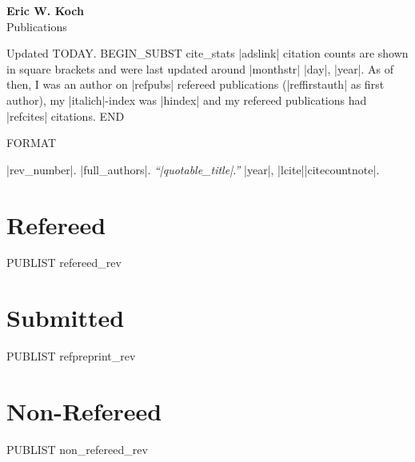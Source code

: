 \documentclass[letterpaper,11pt]{article}
\newcommand{\myname}{Eric W. Koch}
\newcommand{\mysite}{e-koch.github.io}
\newenvironment{publist}{
  \begingroup
  \raggedright
  \begin{description}[leftmargin=4ex,style=sameline]
}{
  \end{description}
  \endgroup
}
\begin{document}
\pagestyle{fancy}
\lhead{} \chead{} \rhead{} \renewcommand{\headrule}{\relax}
\cfoot{\thepage/\pageref*{LastPage}}
\rfoot{\textsc{\myname}}

\begin{center}
\textbf{\Large \myname} \\
{\large Publications}
\end{center}



\noindent Updated %
TODAY.
BEGIN_SUBST cite_stats
|adslink| citation counts are shown in square brackets and were last updated
around |monthstr| |day|, |year|. As of then, I was an author on |refpubs|
refereed publications (|reffirstauth| as first author), my |italich|-index was
|hindex| and my refereed publications had |refcites| citations.
END

FORMAT \item[|rev_number|.] |full_authors|. \textit{``|quotable_title|.''} |year|, |lcite||citecountnote|.



\section*{Refereed}

\begin{publist}
PUBLIST refereed_rev
\end{publist}

\section*{Submitted}

\begin{publist}
PUBLIST refpreprint_rev
\end{publist}

\section*{Non-Refereed}

\begin{publist}
PUBLIST non_refereed_rev
\end{publist}
\end{document}
